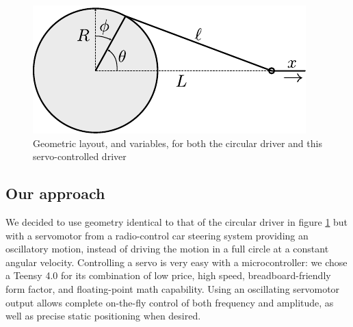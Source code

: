 \documentclass[11 pt]{article}
\begin{document}
\begin{figure}[ht]
	\begin{center}
		\includegraphics{geometry}
	\end{center}
	\caption{Geometric layout, and variables, for both the circular driver and this servo-controlled driver}
	\label{fig:circular}
\end{figure}

\subsection*{Our approach}
We decided to use geometry identical to that of the circular driver in figure \ref{fig:circular} but with a servomotor from a radio-control car steering system providing an oscillatory motion, instead of driving the motion in a full circle at a constant angular velocity. 
Controlling a servo is very easy with a microcontroller: we chose a Teensy 4.0 for its combination of low price, high speed, breadboard-friendly form factor, and floating-point math capability.
Using an oscillating servomotor output allows complete on-the-fly control of both frequency and amplitude, as well as precise static positioning when desired. 
\end{document}
